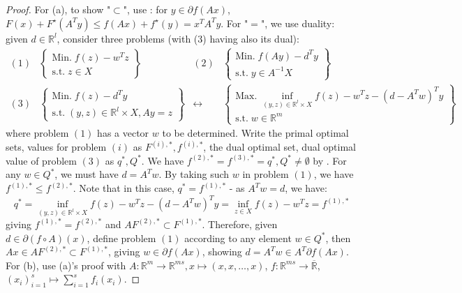 \begin{proof}
	For (a), to show "$\subset$", use : for $y\in \partial f(Ax)$, $F(x)+F^\star(A^Ty)\leq f(Ax)+f^\star(y)=x^TA^Ty$. For "$=$", we use duality: given $d\in \mathbb{R}^l$, consider three problems (with (3) having also its dual):
	\[
		\begin{matrix}
			(1)                             &
			\begin{Bmatrix}
				\text{Min.}\;    f(z) - w^Tz \\
				\text{s.t.}\;  z\in X
			\end{Bmatrix} & (2)                                                & \begin{Bmatrix}
				                                                                     \text{Min.}\;    f(Ay)-d^Ty \\
				                                                                     \text{s.t.}\;  y\in A^{-1}X
			                                                                     \end{Bmatrix} \\
			(3)                             & \begin{Bmatrix}
				                                  \text{Min.}\;   f(z)-d^Ty \\
				                                  \text{s.t.}\;  (y,z)\in \mathbb{R}^l\times X, Ay=z
			                                  \end{Bmatrix} & \leftrightarrow                &
			\begin{Bmatrix}
				\text{Max.}\;    \inf_{(y,z)\in \mathbb{R}^l\times X}f(z)-w^Tz-(d-A^Tw)^Ty \\
				\text{s.t.}\;    w\in \mathbb{R}^m
			\end{Bmatrix}
		\end{matrix}
	\]
	where problem $(1)$ has a vector $w$ to be determined. Write the primal optimal sets, values for problem $(i)$ as $F^{(i),\ast},f^{(i),\ast}$, the dual optimal set, dual optimal value of problem $(3)$ as $q^\ast,Q^\ast$. We have $f^{(2),\ast}=f^{(3),\ast}=q^{\ast},Q^\ast\neq\emptyset$ by . For any $w\in Q^\ast$, we must have $d=A^Tw$. By taking such $w$ in problem $(1)$, we have $f^{(1),\ast}\leq f^{(2),\ast}$. Note that in this case, $q^\ast=f^{(1),\ast}$ - as $A^Tw=d$, we have:
	\[
		q^\ast = \inf_{(y,z)\in \mathbb{R}^l\times X}f(z)-w^Tz-(d-A^Tw)^Ty =  \inf_{z\in X}f(z)-w^Tz=f^{(1),\ast}
	\]
	giving $f^{(1),\ast}=f^{(2),\ast}$ and $AF^{(2),\ast}\subset F^{(1),\ast}$. Therefore, given $d\in \partial (f\circ A)(x)$, define problem $(1)$ according to any element $w\in Q^\ast$, then $Ax \in AF^{(2),\ast}\subset F^{(1),\ast}$, giving $w\in \partial f(Ax)$, showing $d=A^Tw\in A^T\partial f(Ax)$. For (b), use (a)'s proof with $A:\mathbb{R}^m\to \mathbb{R}^{ms},x\mapsto (x,x,\dotsc,x)$, $f:\mathbb{R}^{ms}\to \overline{\mathbb{R}}$, $(x_i)_{i=1}^s\mapsto \sum_{i=1}^sf_i(x_i)$.
\end{proof}

